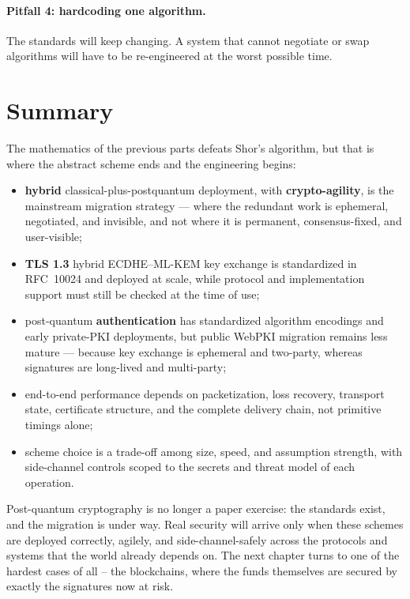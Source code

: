 \paragraph{Pitfall 4: hardcoding one algorithm.}
The standards will keep changing. A system that cannot negotiate or swap algorithms will have to be re-engineered at the worst possible time.

\section{Summary}
The mathematics of the previous parts defeats Shor's algorithm, but that is where the abstract scheme ends and the engineering begins:

\begin{itemize}
  \item \textbf{hybrid} classical-plus-postquantum deployment, with \textbf{crypto-agility}, is the mainstream migration strategy --- where the redundant work is ephemeral, negotiated, and invisible, and not where it is permanent, consensus-fixed, and user-visible;
  \item \textbf{TLS 1.3} hybrid ECDHE--ML-KEM key exchange is standardized in RFC~10024 and deployed at scale, while protocol and implementation support must still be checked at the time of use;
  \item post-quantum \textbf{authentication} has standardized algorithm encodings and early private-PKI deployments, but public WebPKI migration remains less mature --- because key exchange is ephemeral and two-party, whereas signatures are long-lived and multi-party;
  \item end-to-end performance depends on packetization, loss recovery, transport state, certificate structure, and the complete delivery chain, not primitive timings alone;
  \item scheme choice is a trade-off among size, speed, and assumption strength, with side-channel controls scoped to the secrets and threat model of each operation.
\end{itemize}

Post-quantum cryptography is no longer a paper exercise: the standards exist, and the migration is under way. Real security will arrive only when these schemes are deployed correctly, agilely, and side-channel-safely across the protocols and systems that the world already depends on. The next chapter turns to one of the hardest cases of all -- the blockchains, where the funds themselves are secured by exactly the signatures now at risk.

\printbibliography[heading=chapterrefs]
